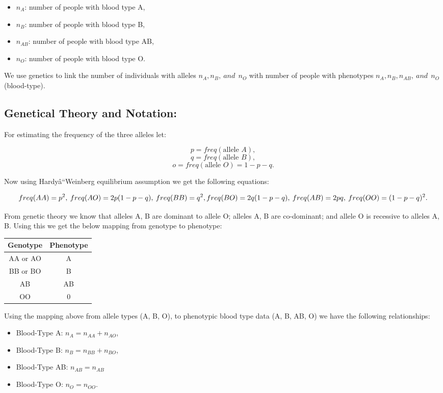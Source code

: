 \documentclass[]{article}
\providecommand{\tightlist}{%
  \setlength{\itemsep}{0pt}\setlength{\parskip}{0pt}}
\begin{document}
\begin{itemize}
\tightlist
\item
  \(n_A\): number of people with blood type A,
\item
  \(n_B\): number of people with blood type B,
\item
  \(n_{AB}\): number of people with blood type AB,
\item
  \(n_O\): number of people with blood type O.
\end{itemize}

We use genetics to link the number of individuals with alleles
\(n_A, n_B, \: and\: \: n_O\) with number of people with phenotypes
\(n_A, n_B, n_{AB}, \:and\: \: n_O\) (blood-type).

\subsection{Genetical Theory and
Notation:}\label{genetical-theory-and-notation}

For estimating the frequency of the three alleles let:

\[p=freq(\mbox{allele } A),\] \[q=freq(\mbox{allele } B),\]
\[o=freq(\mbox{allele } O)= 1-p-q .\]

Now using Hardyâ``Weinberg equilibrium assumption we get the following
equations:

\[freq(AA)=p^2, \:freq(AO)=2p(1-p-q), \:  freq(BB)=q^2, \\ freq(BO)=2q(1-p-q), \:  freq(AB)=2pq, \: freq(OO)=(1-p-q)^2.\]

From genetic theory we know that alleles A, B are dominant to allele O;
alleles A, B are co-dominant; and allele O is recessive to alleles A, B.
Using this we get the below mapping from genotype to phenotype:

\begin{longtable}[]{@{}cc@{}}
\toprule
Genotype & Phenotype\tabularnewline
\midrule
\endhead
AA or AO & A\tabularnewline
BB or BO & B\tabularnewline
AB & AB\tabularnewline
OO & 0\tabularnewline
\bottomrule
\end{longtable}

Using the mapping above from allele types (A, B, O), to phenotypic blood
type data (A, B, AB, O) we have the following relationships:

\begin{itemize}
\tightlist
\item
  Blood-Type A: \(n_A=n_{AA}+n_{AO}\),
\item
  Blood-Type B: \(n_B=n_{BB}+n_{BO}\),
\item
  Blood-Type AB: \(n_{AB}=n_{AB}\)
\item
  Blood-Type O: \(n_{O}=n_{OO}\).
\end{itemize}
\end{document}
